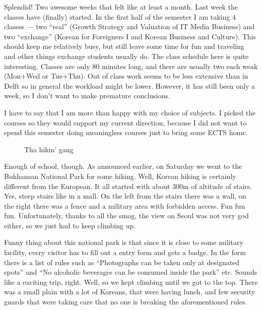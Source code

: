 
\begin{post}
	\begin{content}
Splendid! Two awesome weeks that felt like at least a month. Last week the classes have (finally) started. In the first half of the semester I am taking 4 classes --- two ``real'' (Growth Strategy and Valuation of IT Media Business) and two ``exchange'' (Korean for Foreigners I and Korean Business and Culture). This should keep me relatively busy, but still leave some time for fun and traveling and other things exchange students usually do. The class schedule here is quite interesting. Classes are only 80 minutes long, and there are usually two each weak (Mon+Wed or Tue+Thu). Out of class work seems to be less extensive than in Delft so in general the workload might be lower. However, it has still been only a week, so I don't want to make premature conclusions.

I have to say that I am more than happy with my choice of subjects. I picked the courses so they would support my current direction, because I did not want to spend this semester doing meaningless courses just to bring some ECTS home.

\begin{figure}
\centering\vspace{-12pt}
\caption*{Tha hikin' gang}
\vspace{-25pt}
\end{figure}Enough of school, though. As announced earlier, on Saturday we went to the Bukhansan National Park for some hiking. Well, Korean hiking is certainly different from the European. It all started with about 300m of altitude of stairs. Yes, steep stairs like in a mall. On the left from the stairs there was a wall, on the right there was a fence and a military area with forbidden access. Fun fun fun. Unfortunately, thanks to all the smog, the view on Seoul was not very god either, so we just had to keep climbing up.

Funny thing about this national park is that since it is close to some military facility, every visitor has to fill out a entry form and gets a badge. In the form there is a list of rules such as ``Photographs can be taken only at designated spots'' and ``No alcoholic beverages can be consumed inside the park'' etc. Sounds like a exciting trip, right. Well, so we kept climbing until we got to the top. There was a small plain with a lot of Koreans, that were having lunch, and few security guards that were taking care that no one is breaking the aforementioned rules.


\end{content}
\end{post}
